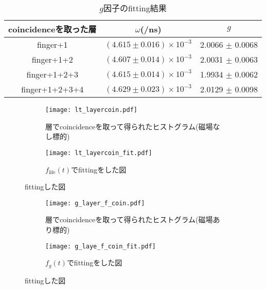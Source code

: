 \begin{table}[H]
\caption{$g$因子のfitting結果}
\label{fit_g}
\begin{center}
\begin{tabular}{ccc}\toprule
coincidenceを取った層 	& $\omega$(/ns) 			& $g$ \\ \midrule
finger+1 		& $( 4.615 \pm 0.016 ) \times 10^{-3}$ 	& 2.0066 $\pm$ 0.0068 \\
finger+1+2 		& $( 4.607 \pm 0.014 ) \times 10^{-3}$ 	& 2.0031 $\pm$ 0.0063 \\
finger+1+2+3 		& $( 4.615 \pm 0.014 ) \times 10^{-3}$ 	& 1.9934 $\pm$ 0.0062 \\
finger+1+2+3+4 		& $( 4.629 \pm 0.023 ) \times 10^{-3}$ 	& 2.0129 $\pm$ 0.0098 \\ \bottomrule
\end{tabular}
\end{center}
\end{table}%


\begin{figure}[H]
\centering
\begin{subfigure}{\columnwidth}
\centering
\texttt{[image: lt\_layercoin.pdf]}
\caption{層でcoincidenceを取って得られたヒストグラム(磁場なし標的)}
\label{lt_layercoin}
\end{subfigure}
\begin{subfigure}{\columnwidth}
\centering
\texttt{[image: lt\_layercoin\_fit.pdf]}
\caption{$f_{\mathrm{life}}(t)$でfittingをした図}
\label{lt_layercoin_fit}
\end{subfigure}
\caption{fittingした図}
\label{lt_layercoin_all}
\end{figure}

\begin{figure}[H]
\centering
\begin{subfigure}{\columnwidth}
\centering
\texttt{[image: g\_layer\_f\_coin.pdf]}
\caption{層でcoincidenceを取って得られたヒストグラム(磁場あり標的)}
\label{g_layercoin}
\end{subfigure}
\begin{subfigure}{\columnwidth}
\centering
\texttt{[image: g\_laye\_f\_coin\_fit.pdf]}
\caption{$f_{g}(t)$でfittingをした図}
\label{g_layercoin_fit}
\end{subfigure}
\caption{fittingした図}
\label{g_layercoin_all}
\end{figure}


